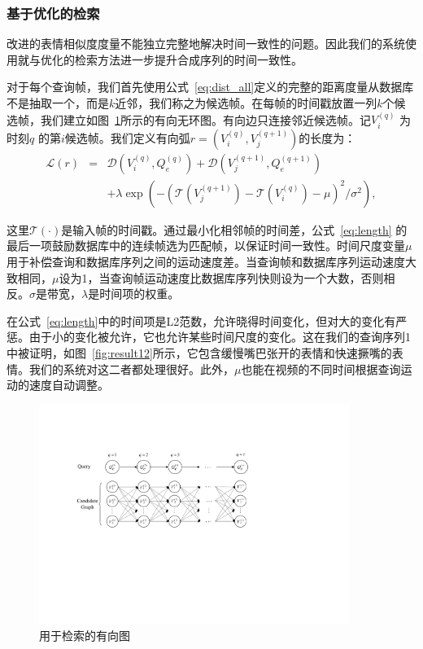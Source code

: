 \subsubsection{基于优化的检索}
改进的表情相似度度量不能独立完整地解决时间一致性的问题。因此我们的系统使用就与优化的检索方法进一步提升合成序列的时间一致性。

对于每个查询帧，我们首先使用公式~\ref{eq:dist_all}定义的完整的距离度量从数据库不是抽取一个，而是$k$近邻，我们称之为候选帧。在每帧的时间戳放置一列$k$个候选帧，我们建立如图~\ref{fig:dijkstra}所示的有向无环图。有向边只连接邻近候选帧。记$V_i^{(q)}$ 为时刻$q$ 的第$i$候选帧。我们定义有向弧$r=(V_i^{(q)}, V_j^{(q+1)})$的长度为：
\begin{eqnarray}\label{eq:length}
\mathcal{L}(r)&=&\mathcal{D}(V_i^{(q)},Q_e^{(q)})+
        \mathcal{D}(V_j^{(q+1)},Q_e^{(q+1)})\nonumber\\
        &&+\lambda \exp ( - {{(\mathcal{T}(V_j^{(q + 1)} ) - \mathcal{T}(V_i^{(q)} ) - \mu )^2 }}/{{\sigma ^2 }}),
\end{eqnarray}

这里$\mathcal{T}(\cdot)$是输入帧的时间戳。通过最小化相邻帧的时间差，公式~\ref{eq:length} 的最后一项鼓励数据库中的连续帧选为匹配帧，以保证时间一致性。时间尺度变量$\mu$ 用于补偿查询和数据库序列之间的运动速度差。当查询帧和数据库序列运动速度大致相同，$\mu$设为1，当查询帧运动速度比数据库序列快则设为一个大数，否则相反。$\sigma$是带宽，$\lambda$是时间项的权重。

在公式~\ref{eq:length}中的时间项是L2范数，允许晓得时间变化，但对大的变化有严惩。由于小的变化被允许，它也允许某些时间尺度的变化。这在我们的查询序列1中被证明，如图~\ref{fig:result12}所示，它包含缓慢嘴巴张开的表情和快速撅嘴的表情。我们的系统对这二者都处理很好。此外，$\mu$也能在视频的不同时间根据查询运动的速度自动调整。

\begin{figure}[htbp]
\centering
    \includegraphics[width=0.90\textwidth]{data/img/dijkstra.pdf}
    \caption{用于检索的有向图}
    \label{fig:dijkstra}
\end{figure}

